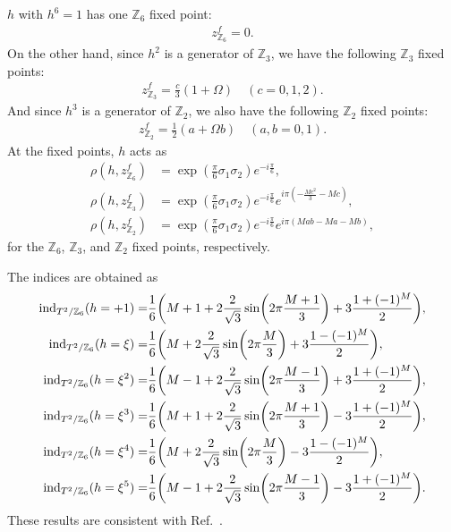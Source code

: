 \documentclass[11pt]{article}
\begin{document}
$h$ with $h^6=1$ has one $\mathbb{Z}_6$ fixed point:
\begin{align}
    z^f_{\mathbb{Z}_6}=0.
\end{align}
On the other hand, since $h^2$ is a generator of $\mathbb{Z}_3$, we have the following $\mathbb{Z}_3$ fixed points:
\begin{align}
    z^f_{\mathbb{Z}_3}=\frac{c}{3}(1+\Omega)\quad (c=0,1,2).
\end{align}
And since $h^3$ is a generator of $\mathbb{Z}_2$, we also have the following $\mathbb{Z}_2$ fixed points:
\begin{align}
    z^f_{\mathbb{Z}_2}=\frac{1}{2}(a+\Omega b)\quad(a,b=0,1).
\end{align}
At the fixed points, $h$ acts as 
\begin{align}
    \rho(h,z^f_{\mathbb{Z}_6})&=\exp(\frac{\pi}{6} \sigma_1 \sigma_2)e^{-i\frac{\pi}{6}}, \\
    \rho(h,z^f_{\mathbb{Z}_3})&=\exp(\frac{\pi}{6} \sigma_1 \sigma_2)e^{-i\frac{\pi}{6}}e^{i \pi \left(- \frac{M c^{2}}{3} - M c\right)},\\
     \rho(h,z^f_{\mathbb{Z}_2})&=\exp(\frac{\pi}{6} \sigma_1 \sigma_2)e^{-i\frac{\pi}{6}}e^{i \pi \left(M a b - M a - M b\right)},
\end{align}
for the $\mathbb{Z}_6$, $\mathbb{Z}_3$, and $\mathbb{Z}_2$ fixed points, respectively.


The indices are obtained as
\begin{align}
    \text{ind}_{T^2/{\mathbb{Z}_6}}(h=+1)=& \frac{1}{6}\qty( M+1 +2 \frac{2}{\sqrt{3}} \sin (2\pi \frac{M+1}{3})+ 3 \frac{1+(-1)^M}{2} ),\\
    \text{ind}_{T^2/{\mathbb{Z}_6}}(h=\xi)=& \frac{1}{6}\qty( M +2 \frac{2}{\sqrt{3}} \sin (2\pi \frac{M}{3})+3 \frac{1-(-1)^M}{2} ) ,\\
    \text{ind}_{T^2/{\mathbb{Z}_6}}(h=\xi^2)=& \frac{1}{6}\qty( M -1+ 2 \frac{2}{\sqrt{3}} \sin (2\pi \frac{M-1}{3})+3 \frac{1+(-1)^M}{2} ) ,\\
    \text{ind}_{T^2/{\mathbb{Z}_6}}(h=\xi^3)=& \frac{1}{6}\qty( M+1 +2 \frac{2}{\sqrt{3}} \sin (2\pi \frac{M+1}{3})- 3 \frac{1+(-1)^M}{2} ),\\
    \text{ind}_{T^2/{\mathbb{Z}_6}}(h=\xi^4)=& \frac{1}{6}\qty( M +2 \frac{2}{\sqrt{3}} \sin (2\pi \frac{M}{3})-3 \frac{1-(-1)^M}{2} ) ,\\
    \text{ind}_{T^2/{\mathbb{Z}_6}}(h=\xi^5)=& \frac{1}{6}\qty( M -1+ 2 \frac{2}{\sqrt{3}} \sin (2\pi \frac{M-1}{3})-3 \frac{1+(-1)^M}{2} ) .
\end{align}
These results are consistent with Ref.~\cite{Sakamoto:2020pev,Kobayashi:2022tti,Imai:2022bke}.
\end{document}

